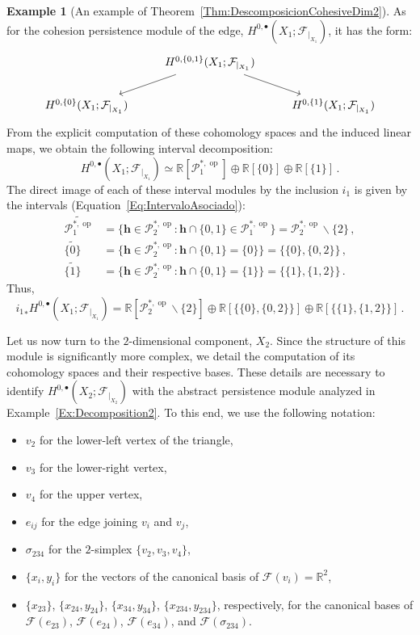 \documentclass[reqno,12pt]{amsart}
\newcommand{\R}{\mathbb{R}}
\newcommand{\cF}{{\mathcal F}}
\newcommand{\cP}{\mathcal{P}}
\DeclareMathOperator{\op}{op}
\newcommand{\0}{\mathbf 0}
\newcommand{\h}{\mathbf{h}}
\theoremstyle{definition}
\newtheorem{example}[theorem]{Example}
\begin{document}
\begin{example}[An example of Theorem~\ref{Thm:DescomposicionCohesiveDim2}]
    As for the cohesion persistence module of the edge, $H^{0,\bullet}(X_1;\cF_{|_{X_1}})$, it has the form:
    \begin{equation}\label{Eq:DiagramaX1}
            \begin{tikzcd}
        & H^{0,\{0,1\}}(X_1;\cF_{|_{X_1}}) \arrow[ld] \arrow[rd]\\
        H^{0,\{0\}}(X_1;\cF_{|_{X_1}}) &  & H^{0,\{1\}}(X_1;\cF_{|_{X_1}})
    \end{tikzcd}
    \end{equation}
    From the explicit computation of these cohomology spaces and the induced linear maps, we obtain the following interval decomposition:
    \[
    H^{0,\bullet}(X_1;\cF_{|_{X_1}})\simeq \R[\cP_1^{*,\op}]\oplus \R[\{0\}] \oplus \R[\{1\}]\, .
    \]
The direct image of each of these interval modules by the inclusion $i_{1}$ is given by the intervals (Equation~\eqref{Eq:IntervaloAsociado}):
\begin{align*}
    \widetilde{\cP^{*,\op}_1}&=\{\h\in \cP^{*,\op}_2 : \h\cap \{0,1\}\in \cP^{*,\op}_1\}=\cP^{*,\op}_2\smallsetminus\{2\}\,,\\[1.5ex]
    \widetilde{\{0\}}&=\{\h\in \cP^{*,\op}_2 :\h\cap \{0,1\}= \{0\}\}=\{\{0\},\{0,2\}\}\,,\\[1.5ex]
    \widetilde{\{1\}}&=\{\h\in \cP^{*,\op}_2 :\h\cap \{0,1\}= \{1\}\}=\{\{1\},\{1,2\}\}\,.
\end{align*}
Thus,
\begin{equation}\label{Eq:Descomposicioni1X1}
    {i_{1}}_*H^{0,\bullet}(X_1;\cF_{|_{X_1}})=\R[\cP^{*,\op}_2\smallsetminus\{2\}]\oplus \R[\{\{0\},\{0,2\}\}]\oplus \R[\{\{1\},\{1,2\}\}]\,.
\end{equation}

Let us now turn to the $2$-dimensional component, $X_2$. Since the structure of this module is significantly more complex, we detail the computation of its cohomology spaces and their respective bases. These details are necessary to identify $H^{0,\bullet}(X_2;\cF_{|_{X_2}})$ with the abstract persistence module analyzed in Example~\ref{Ex:Decomposition2}. To this end, we use the following notation:
\begin{itemize}
    \item $v_2$ for the lower-left vertex of the triangle,
    \item $v_3$ for the lower-right vertex,
    \item $v_4$ for the upper vertex,
    \item $e_{ij}$ for the edge joining $v_i$ and $v_j$,
    \item $\sigma_{234}$ for the $2$-simplex $\{v_2,v_3,v_4\}$,
    \item $\{x_i,y_i\}$ for the vectors of the canonical basis of $\cF(v_i)=\R^2$,
    \item $\{x_{23}\}$, $\{x_{24},y_{24}\}$, $\{x_{34},y_{34}\}$, $\{x_{234},y_{234}\}$, respectively, for the canonical bases of $\cF(e_{23})$, $\cF(e_{24})$, $\cF(e_{34})$, and $\cF(\sigma_{234})$.
\end{itemize}
 

\end{example}
\end{document}
